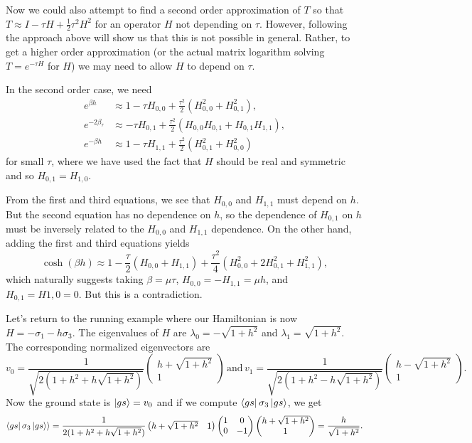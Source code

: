 \documentclass[11pt,reqno]{amsart}
\begin{document}
	Now we could also attempt to find a second order approximation of $T$ so that $T\approx I - \tau H + \frac{1}{2}\tau^2 H^2$ for an operator $H$ not depending on $\tau$. 
	However, following the approach above will show us that this is not possible in general.  
	Rather, to get a higher order approximation (or the actual matrix logarithm solving $T=e^{-\tau H}$ for $H$) we may need to allow $H$ to depend on $\tau$. 
	
	In the second order case, we need 
	\begin{align*}
		e^{\beta h} &\approx 1- \tau H_{0,0}+\frac{\tau^2}{2}(H_{0,0}^2+H_{0,1}^2),\\
		e^{-2\beta_\tau} &\approx -\tau H_{0,1}+\frac{\tau^2}{2}(H_{0,0}H_{0,1}+H_{0,1}H_{1,1}),\\
		e^{-\beta h} &\approx 1 - \tau H_{1,1}+\frac{\tau^2}{2}(H_{0,1}^2+H_{0,0}^2)
	\end{align*}
	for small $\tau$, where we have used the fact that $H$ should be real and symmetric and so $H_{0,1}=H_{1,0}$.
	
	From the first and third equations, we see that $H_{0,0}$ and $H_{1,1}$ must depend on $h$. 
	But the second equation has no dependence on $h$, so the dependence of $H_{0,1}$ on $h$ must be inversely related to the $H_{0,0}$ and $H_{1,1}$ dependence.
	On the other hand, adding the first and third equations yields
	\[\cosh(\beta h) \approx 1-\frac{\tau}{2}( H_{0,0}+ H_{1,1})+\frac{\tau^2}{4}(H_{0,0}^2+2H_{0,1}^2+H_{1,1}^2), \]
	which naturally suggests  taking $\beta=\mu\tau$, $H_{0,0}=-H_{1,1}=\mu h$, and $H_{0,1}=H{1,0}=0$. But this is a contradiction.
	
	Let's return to the running example where our Hamiltonian is now $H=-\sigma_1-h\sigma_3$.
	The eigenvalues of $H$ are $\lambda_0=-\sqrt{1+h^2}$ and $\lambda_1=\sqrt{1+h^2}$.
	The corresponding normalized eigenvectors are
		\[v_0= \frac{1}{\sqrt{2(1+h^2+h\sqrt{1+h^2})}}\begin{pmatrix}
		h+\sqrt{1+h^2} \\ 1
		\end{pmatrix} \, \text{and} \, v_1= \frac{1}{\sqrt{2(1+h^2-h\sqrt{1+h^2})}}\begin{pmatrix}
		h-\sqrt{1+h^2} \\ 1
		\end{pmatrix}. \]
	Now the ground state is $\ket{gs}=v_0$ and if we compute $\bra{gs} \sigma_3 \ket{gs}$, we get
		\[\bra{gs} \sigma_3 \ket{gs} \rangle=\frac{1}{2(1+h^2+h\sqrt{1+h^2})}\begin{pmatrix}
		h+\sqrt{1+h^2} & 1
		\end{pmatrix}
		\begin{pmatrix}
		1 & 0 \\
		0 & -1
		\end{pmatrix}
		\begin{pmatrix}
		h+\sqrt{1+h^2} \\ 1
		\end{pmatrix}=\frac{h}{\sqrt{1+h^2}} .\]
	
\end{document}
